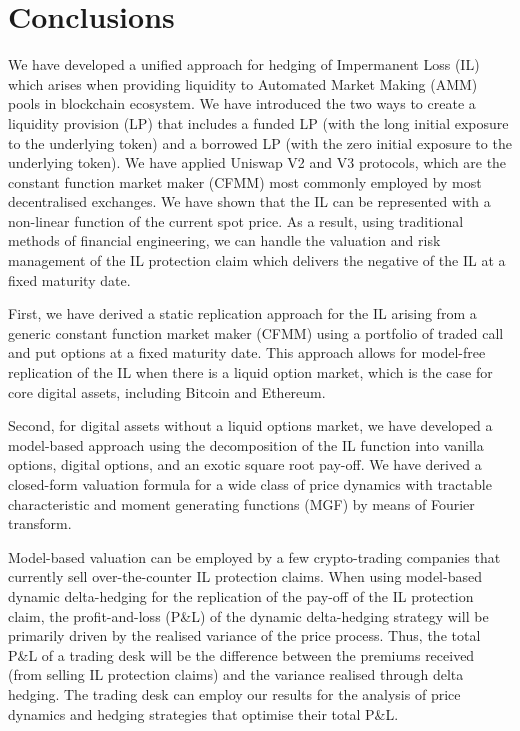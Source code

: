 \documentclass[pdftex,11pt,a4paper] {article}
\begin{document}
\section{Conclusions}

\label{sec:conc}

We have developed a unified approach for hedging of Impermanent Loss (IL)
which arises when providing liquidity to Automated Market Making (AMM) pools
in blockchain ecosystem. We have introduced the two ways to create a
liquidity provision (LP) that includes a funded LP (with the long initial
exposure to the underlying token) and a borrowed LP (with the zero initial
exposure to the underlying token). We have applied Uniswap V2 and V3
protocols, which are the constant function market maker (CFMM) most commonly
employed by most decentralised exchanges. We have shown that the IL can
be represented with a non-linear function of the current spot price. As a
result, using traditional methods of financial engineering, we can handle
the valuation and risk management of the IL protection claim which delivers
the negative of the IL at a fixed maturity date.

First, we have derived a static replication approach for the IL arising from
a generic constant function market maker (CFMM) using a portfolio of traded
call and put options at a fixed maturity date. This approach allows for
model-free replication of the IL when there is a liquid option market, which
is the case for core digital assets, including Bitcoin and Ethereum.

Second, for digital assets without a liquid options market, we have
developed a model-based approach using the decomposition of the IL function
into vanilla options, digital options, and an exotic square root pay-off. We
have derived a closed-form valuation formula for a wide class of price
dynamics with tractable characteristic and moment generating functions (MGF)
by means of Fourier transform.

Model-based valuation can be employed by a few crypto-trading companies that
currently sell over-the-counter IL protection claims. When using model-based
dynamic delta-hedging for the replication of the pay-off of the IL
protection claim, the profit-and-loss (P\&L) of the dynamic delta-hedging
strategy will be primarily driven by the realised variance of the price
process. Thus, the total P\&L of a trading desk will be the difference
between the premiums received (from selling IL protection claims) and the
variance realised through delta hedging. The trading desk can employ our results
for the analysis of price dynamics and hedging strategies that optimise
their total P\&L.
\end{document}
